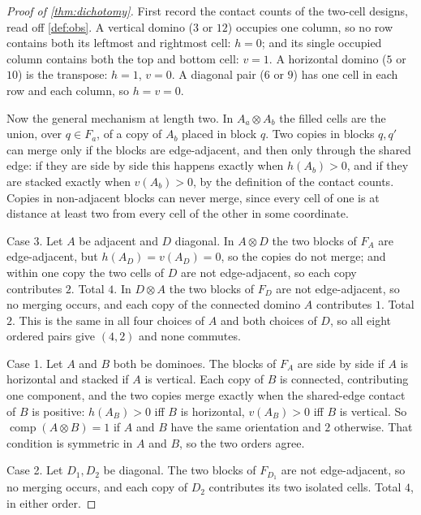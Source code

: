 \documentclass[11pt]{amsart}
\theoremstyle{definition}
\theoremstyle{remark}
\begin{document}
\begin{proof}[Proof of \cref{thm:dichotomy}]
First record the contact counts of the two-cell designs, read off \cref{def:obs}. A vertical domino ($3$ or $12$) occupies one column, so no row contains both its leftmost and rightmost cell: $h = 0$; and its single occupied column contains both the top and bottom cell: $v = 1$. A horizontal domino ($5$ or $10$) is the transpose: $h = 1$, $v = 0$. A diagonal pair ($6$ or $9$) has one cell in each row and each column, so $h = v = 0$.

Now the general mechanism at length two. In $A_a \otimes A_b$ the filled cells are the union, over $q \in F_a$, of a copy of $A_b$ placed in block $q$. Two copies in blocks $q, q'$ can merge only if the blocks are edge-adjacent, and then only through the shared edge: if they are side by side this happens exactly when $h(A_b) > 0$, and if they are stacked exactly when $v(A_b) > 0$, by the definition of the contact counts. Copies in non-adjacent blocks can never merge, since every cell of one is at distance at least two from every cell of the other in some coordinate.

Case 3. Let $A$ be adjacent and $D$ diagonal. In $A \otimes D$ the two blocks of $F_A$ are edge-adjacent, but $h(A_D) = v(A_D) = 0$, so the copies do not merge; and within one copy the two cells of $D$ are not edge-adjacent, so each copy contributes $2$. Total $4$. In $D \otimes A$ the two blocks of $F_D$ are not edge-adjacent, so no merging occurs, and each copy of the connected domino $A$ contributes $1$. Total $2$. This is the same in all four choices of $A$ and both choices of $D$, so all eight ordered pairs give $(4,2)$ and none commutes.

Case 1. Let $A$ and $B$ both be dominoes. The blocks of $F_A$ are side by side if $A$ is horizontal and stacked if $A$ is vertical. Each copy of $B$ is connected, contributing one component, and the two copies merge exactly when the shared-edge contact of $B$ is positive: $h(A_B) > 0$ iff $B$ is horizontal, $v(A_B) > 0$ iff $B$ is vertical. So $\operatorname{comp}(A \otimes B) = 1$ if $A$ and $B$ have the same orientation and $2$ otherwise. That condition is symmetric in $A$ and $B$, so the two orders agree.

Case 2. Let $D_1, D_2$ be diagonal. The two blocks of $F_{D_1}$ are not edge-adjacent, so no merging occurs, and each copy of $D_2$ contributes its two isolated cells. Total $4$, in either order.
\end{proof}
\end{document}
